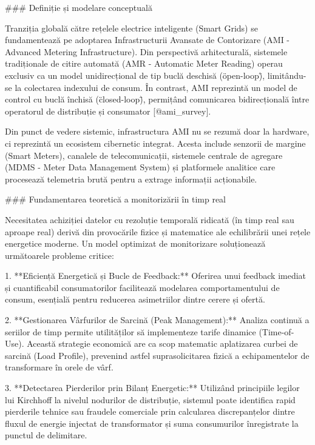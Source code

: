 ### Definiție și modelare conceptuală

Tranziția globală către rețelele electrice inteligente (Smart Grids) se
fundamentează pe adoptarea Infrastructurii Avansate de Contorizare
(AMI - Advanced Metering Infrastructure). Din perspectivă arhitecturală,
sistemele tradiționale de citire automată (AMR - Automatic Meter
Reading) operau exclusiv ca un model unidirecțional de tip buclă
deschisă (\"open-loop\"), limitându-se la colectarea indexului de
consum. În contrast, AMI reprezintă un model de control cu buclă închisă
(\"closed-loop\"), permițând comunicarea bidirecțională între operatorul
de distribuție și consumator [@ami_survey].

Din punct de vedere sistemic, infrastructura AMI nu se rezumă doar la
hardware, ci reprezintă un ecosistem cibernetic integrat. Acesta include
senzorii de margine (Smart Meters), canalele de telecomunicații,
sistemele centrale de agregare (MDMS - Meter Data Management System) și
platformele analitice care procesează telemetria brută pentru a extrage
informații acționabile.

### Fundamentarea teoretică a monitorizării în timp real

Necesitatea achiziției datelor cu rezoluție temporală ridicată (în timp
real sau aproape real) derivă din provocările fizice și matematice ale
echilibrării unei rețele energetice moderne. Un model optimizat de
monitorizare soluționează următoarele probleme critice:

1.  **Eficiență Energetică și Bucle de Feedback:** Oferirea unui
    feedback imediat și cuantificabil consumatorilor facilitează
    modelarea comportamentului de consum, esențială pentru reducerea
    asimetriilor dintre cerere și ofertă.

2.  **Gestionarea Vârfurilor de Sarcină (Peak Management):** Analiza
    continuă a seriilor de timp permite utilităților să implementeze
    tarife dinamice (Time-of-Use). Această strategie economică are ca
    scop matematic aplatizarea curbei de sarcină (Load Profile),
    prevenind astfel suprasolicitarea fizică a echipamentelor de
    transformare în orele de vârf.

3.  **Detectarea Pierderilor prin Bilanț Energetic:** Utilizând
    principiile legilor lui Kirchhoff la nivelul nodurilor de
    distribuție, sistemul poate identifica rapid pierderile tehnice sau
    fraudele comerciale prin calcularea discrepanțelor dintre fluxul de
    energie injectat de transformator și suma consumurilor înregistrate
    la punctul de delimitare.

